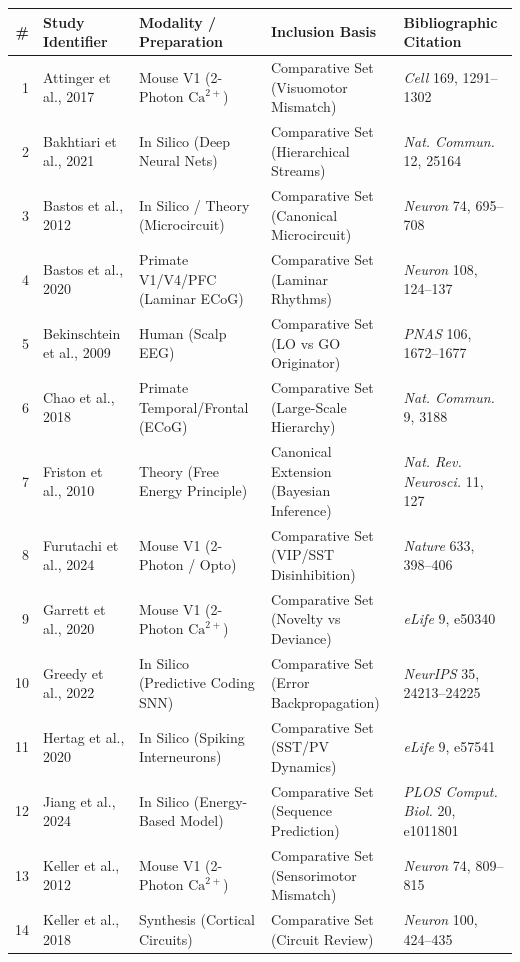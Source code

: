 \documentclass[12pt]{article}
\begin{document}
\noindent\begin{tabularx}{\textwidth}{@{}r l p{1.6in} p{1.6in} >{\raggedright\arraybackslash}X@{}}
\toprule
\textbf{\#} & \textbf{Study Identifier} & \textbf{Modality / Preparation} & \textbf{Inclusion Basis} & \textbf{Bibliographic Citation} \\
\midrule
1 & Attinger et al., 2017 & Mouse V1 (2-Photon $\text{Ca}^{2+}$) & Comparative Set (Visuomotor Mismatch) & \emph{Cell} 169, 1291--1302 \\
2 & Bakhtiari et al., 2021 & In Silico (Deep Neural Nets) & Comparative Set (Hierarchical Streams) & \emph{Nat. Commun.} 12, 25164 \\
3 & Bastos et al., 2012 & In Silico / Theory (Microcircuit) & Comparative Set (Canonical Microcircuit) & \emph{Neuron} 74, 695--708 \\
4 & Bastos et al., 2020 & Primate V1/V4/PFC (Laminar ECoG) & Comparative Set (Laminar Rhythms) & \emph{Neuron} 108, 124--137 \\
5 & Bekinschtein et al., 2009 & Human (Scalp EEG) & Comparative Set (LO vs GO Originator) & \emph{PNAS} 106, 1672--1677 \\
6 & Chao et al., 2018 & Primate Temporal/Frontal (ECoG) & Comparative Set (Large-Scale Hierarchy) & \emph{Nat. Commun.} 9, 3188 \\
7 & Friston et al., 2010 & Theory (Free Energy Principle) & Canonical Extension (Bayesian Inference) & \emph{Nat. Rev. Neurosci.} 11, 127 \\
8 & Furutachi et al., 2024 & Mouse V1 (2-Photon / Opto) & Comparative Set (VIP/SST Disinhibition) & \emph{Nature} 633, 398--406 \\
9 & Garrett et al., 2020 & Mouse V1 (2-Photon $\text{Ca}^{2+}$) & Comparative Set (Novelty vs Deviance) & \emph{eLife} 9, e50340 \\
10 & Greedy et al., 2022 & In Silico (Predictive Coding SNN) & Comparative Set (Error Backpropagation) & \emph{NeurIPS} 35, 24213--24225 \\
11 & Hertag et al., 2020 & In Silico (Spiking Interneurons) & Comparative Set (SST/PV Dynamics) & \emph{eLife} 9, e57541 \\
12 & Jiang et al., 2024 & In Silico (Energy-Based Model) & Comparative Set (Sequence Prediction) & \emph{PLOS Comput. Biol.} 20, e1011801 \\
13 & Keller et al., 2012 & Mouse V1 (2-Photon $\text{Ca}^{2+}$) & Comparative Set (Sensorimotor Mismatch) & \emph{Neuron} 74, 809--815 \\
14 & Keller et al., 2018 & Synthesis (Cortical Circuits) & Comparative Set (Circuit Review) & \emph{Neuron} 100, 424--435 \\

\end{tabularx}
\end{document}
